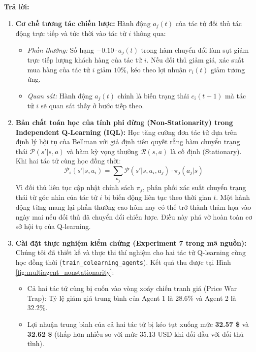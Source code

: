 \documentclass[12pt,a4paper]{article}
\begin{document}
\textbf{Trả lời:}
\begin{enumerate}
    \item \textbf{Cơ chế tương tác chiến lược:}
    Hành động $a_j(t)$ của tác tử đối thủ tác động trực tiếp và tức thời vào tác tử $i$ thông qua:
    \begin{itemize}
        \item \textit{Phần thưởng:} Số hạng $-0.10 \cdot a_j(t)$ trong hàm chuyển đổi làm sụt giảm trực tiếp lượng khách hàng của tác tử $i$. Nếu đối thủ giảm giá, xác suất mua hàng của tác tử $i$ giảm $10\%$, kéo theo lợi nhuận $r_i(t)$ giảm tương ứng.
        \item \textit{Quan sát:} Hành động $a_j(t)$ chính là biến trạng thái $c_i(t+1)$ mà tác tử $i$ sẽ quan sát thấy ở bước tiếp theo.
    \end{itemize}
    \item \textbf{Bản chất toán học của tính phi dừng (Non-Stationarity) trong Independent Q-Learning (IQL):}
    Học tăng cường đơn tác tử dựa trên định lý hội tụ của Bellman với giả định tiên quyết rằng hàm chuyển trạng thái $\mathcal{P}(s'|s, a)$ và hàm kỳ vọng thưởng $\mathcal{R}(s, a)$ là cố định (Stationary). Khi hai tác tử cùng học đồng thời:
    \begin{equation}
    \mathcal{P}_i(s' | s, a_i) = \sum_{a_j} \mathcal{P}(s' | s, a_i, a_j) \cdot \pi_j(a_j | s)
    \end{equation}
    Vì đối thủ liên tục cập nhật chính sách $\pi_j$, phân phối xác suất chuyển trạng thái từ góc nhìn của tác tử $i$ bị biến động liên tục theo thời gian $t$. Một hành động từng mang lại phần thưởng cao hôm nay có thể trở thành thảm họa vào ngày mai nếu đối thủ đã chuyển đổi chiến lược. Điều này phá vỡ hoàn toàn cơ sở hội tụ của Q-learning.
    \item \textbf{Cài đặt thực nghiệm kiểm chứng (Experiment 7 trong mã nguồn):}
    Chúng tôi đã thiết kế và thực thi thí nghiệm cho hai tác tử Q-learning cùng học đồng thời (\texttt{train\_colearning\_agents}). Kết quả thu được tại Hình \ref{fig:multiagent_nonstationarity}:
    \begin{itemize}
        \item Cả hai tác tử cùng bị cuốn vào vòng xoáy chiến tranh giá (Price War Trap): Tỷ lệ giảm giá trung bình của Agent 1 là $28.6\%$ và Agent 2 là $32.2\%$.
        \item Lợi nhuận trung bình của cả hai tác tử bị kéo tụt xuống mức \textbf{32.57 \$} và \textbf{32.62 \$} (thấp hơn nhiều so với mức $35.13$ USD khi đối đầu với đối thủ tĩnh).
    \end{itemize}
\end{enumerate}
\end{document}
